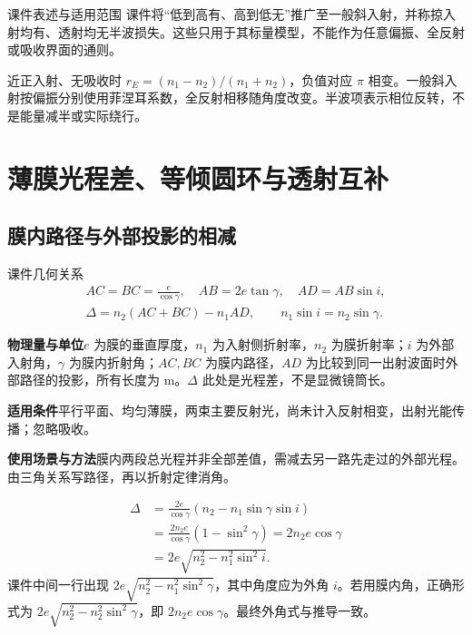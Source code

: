 \documentclass[UTF8,fontset=none,zihao=-4,a4paper]{ctexart}
\newcommand{\chapterpage}[1]{\clearpage\section{#1}}
\newcommand{\explain}[3]{\par\noindent\textbf{物理量与单位}\quad #1\par
\noindent\textbf{适用条件}\quad #2\par
\noindent\textbf{使用场景与方法}\quad #3\par}
\begin{document}
\begin{infobox}[breakable=false]{课件表述与适用范围}
课件将“低到高有、高到低无”推广至一般斜入射，并称掠入射均有、透射均无半波损失。这些只用于其标量模型，不能作为任意偏振、全反射或吸收界面的通则。
\end{infobox}
近正入射、无吸收时 $r_E=(n_1-n_2)/(n_1+n_2)$，负值对应 $\pi$ 相变。一般斜入射按偏振分别使用菲涅耳系数，全反射相移随角度改变。半波项表示相位反转，不是能量减半或实际绕行。

\chapterpage{薄膜光程差、等倾圆环与透射互补}
\subsection{膜内路径与外部投影的相减}
\begin{infobox}[breakable=false]{课件几何关系}
\begin{gather*}
 AC=BC=\frac e{\cos\gamma},\quad AB=2e\tan\gamma,
 \quad AD=AB\sin i,\\
 \Delta=n_2(AC+BC)-n_1AD,
 \qquad n_1\sin i=n_2\sin\gamma.
\end{gather*}
\end{infobox}
\explain{$e$ 为膜的垂直厚度，$n_1$ 为入射侧折射率，$n_2$ 为膜折射率；$i$ 为外部入射角，$\gamma$ 为膜内折射角；$AC,BC$ 为膜内路径，$AD$ 为比较到同一出射波面时外部路径的投影，所有长度为 m。$\Delta$ 此处是光程差，不是显微镜筒长。}{平行平面、均匀薄膜，两束主要反射光，尚未计入反射相变，出射光能传播；忽略吸收。}{膜内两段总光程并非全部差值，需减去另一路先走过的外部光程。由三角关系写路径，再以折射定律消角。}
\begin{align*}
 \Delta&=\frac{2e}{\cos\gamma}(n_2-n_1\sin\gamma\sin i)\\
 &=\frac{2n_2e}{\cos\gamma}(1-\sin^2\gamma)
 =2n_2e\cos\gamma\\
 &=2e\sqrt{n_2^2-n_1^2\sin^2 i}.
\end{align*}
课件中间一行出现 $2e\sqrt{n_2^2-n_1^2\sin^2\gamma}$，其中角度应为外角 $i$。若用膜内角，正确形式为 $2e\sqrt{n_2^2-n_2^2\sin^2\gamma}$，即 $2n_2e\cos\gamma$。最终外角式与推导一致。
\end{document}
